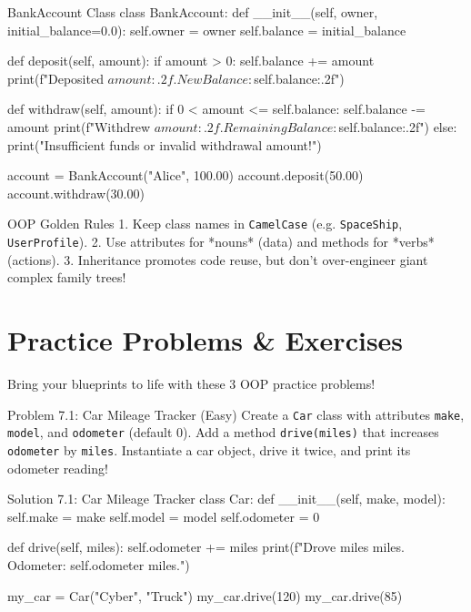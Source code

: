 \begin{pycode}{BankAccount Class}
class BankAccount:
    def __init__(self, owner, initial_balance=0.0):
        self.owner = owner
        self.balance = initial_balance

    def deposit(self, amount):
        if amount > 0:
            self.balance += amount
            print(f"Deposited ${amount:.2f}. New Balance: ${self.balance:.2f}")

    def withdraw(self, amount):
        if 0 < amount <= self.balance:
            self.balance -= amount
            print(f"Withdrew ${amount:.2f}. Remaining Balance: ${self.balance:.2f}")
        else:
            print("Insufficient funds or invalid withdrawal amount!")

account = BankAccount("Alice", 100.00)
account.deposit(50.00)
account.withdraw(30.00)
\end{pycode}

\begin{snakesnack}{OOP Golden Rules}
1. Keep class names in \texttt{CamelCase} (e.g. \texttt{SpaceShip}, \texttt{UserProfile}).
2. Use attributes for *nouns* (data) and methods for *verbs* (actions).
3. Inheritance promotes code reuse, but don't over-engineer giant complex family trees!
\end{snakesnack}

\section{Practice Problems \& Exercises}

Bring your blueprints to life with these 3 OOP practice problems!

\begin{snakelab}{Problem 7.1: Car Mileage Tracker (Easy)}
Create a \texttt{Car} class with attributes \texttt{make}, \texttt{model}, and \texttt{odometer} (default $0$).
Add a method \texttt{drive(miles)} that increases \texttt{odometer} by \texttt{miles}.
Instantiate a car object, drive it twice, and print its odometer reading!
\end{snakelab}

\begin{pycode}{Solution 7.1: Car Mileage Tracker}
class Car:
    def __init__(self, make, model):
        self.make = make
        self.model = model
        self.odometer = 0

    def drive(self, miles):
        self.odometer += miles
        print(f"Drove {miles} miles. Odometer: {self.odometer} miles.")

my_car = Car("Cyber", "Truck")
my_car.drive(120)
my_car.drive(85)
\end{pycode}


